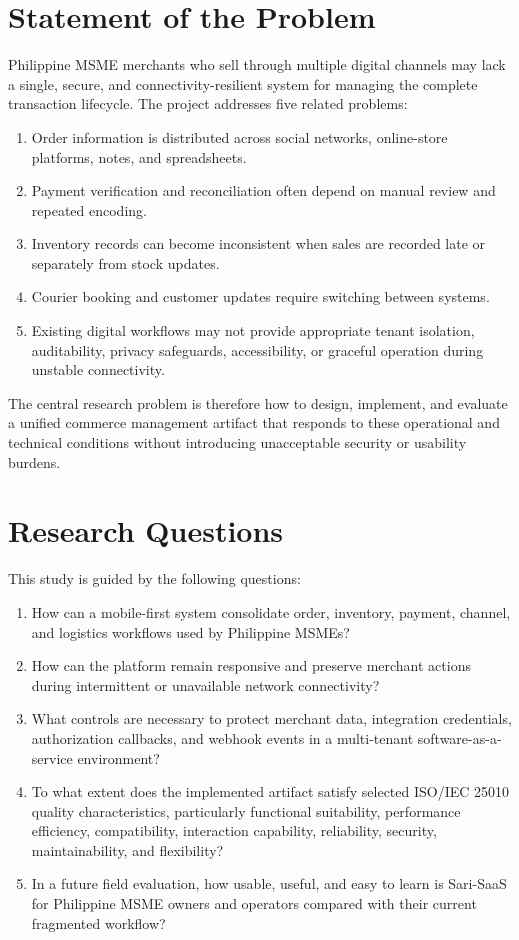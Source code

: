 \documentclass[12pt,oneside]{report}
\begin{document}
\section{Statement of the Problem}
Philippine MSME merchants who sell through multiple digital channels may lack a
single, secure, and connectivity-resilient system for managing the complete
transaction lifecycle. The project addresses five related problems:

\begin{enumerate}
  \item Order information is distributed across social networks, online-store
  platforms, notes, and spreadsheets.
  \item Payment verification and reconciliation often depend on manual review
  and repeated encoding.
  \item Inventory records can become inconsistent when sales are recorded late
  or separately from stock updates.
  \item Courier booking and customer updates require switching between systems.
  \item Existing digital workflows may not provide appropriate tenant
  isolation, auditability, privacy safeguards, accessibility, or graceful
  operation during unstable connectivity.
\end{enumerate}

The central research problem is therefore how to design, implement, and evaluate
a unified commerce management artifact that responds to these operational and
technical conditions without introducing unacceptable security or usability
burdens.

\section{Research Questions}
This study is guided by the following questions:

\begin{enumerate}
  \item How can a mobile-first system consolidate order, inventory, payment,
  channel, and logistics workflows used by Philippine MSMEs?
  \item How can the platform remain responsive and preserve merchant actions
  during intermittent or unavailable network connectivity?
  \item What controls are necessary to protect merchant data, integration
  credentials, authorization callbacks, and webhook events in a multi-tenant
  software-as-a-service environment?
  \item To what extent does the implemented artifact satisfy selected
  ISO/IEC 25010 quality characteristics, particularly functional suitability,
  performance efficiency, compatibility, interaction capability, reliability,
  security, maintainability, and flexibility?
  \item In a future field evaluation, how usable, useful, and easy to learn is
  Sari-SaaS for Philippine MSME owners and operators compared with their current
  fragmented workflow?
\end{enumerate}
\end{document}

